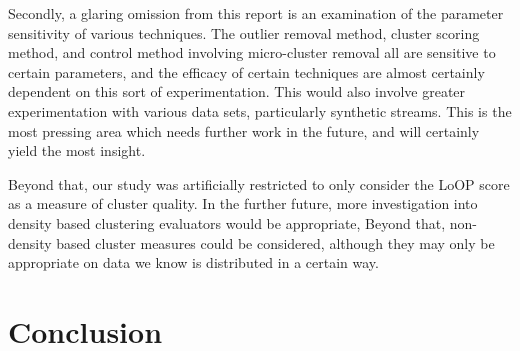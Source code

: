 \documentclass[12pt,a4paper,oneside]{report}
\begin{document}
Secondly, a glaring omission from this report is an examination of the parameter sensitivity of various techniques. The outlier removal method, cluster scoring method, and control method involving micro-cluster removal all are sensitive to certain parameters, and the efficacy of certain techniques are almost certainly dependent on this sort of experimentation. This would also involve greater experimentation with various data sets, particularly synthetic streams.  This is the most pressing area which needs further work in the future, and will certainly yield the most insight. 

Beyond that, our study was artificially restricted to only consider the LoOP score as a measure of cluster quality. In the further future, more investigation into density based clustering evaluators would be appropriate, Beyond that, non-density based cluster measures could be considered, although they may only be appropriate on data we know is distributed in a certain way.

\section*{Conclusion}
\end{document}
